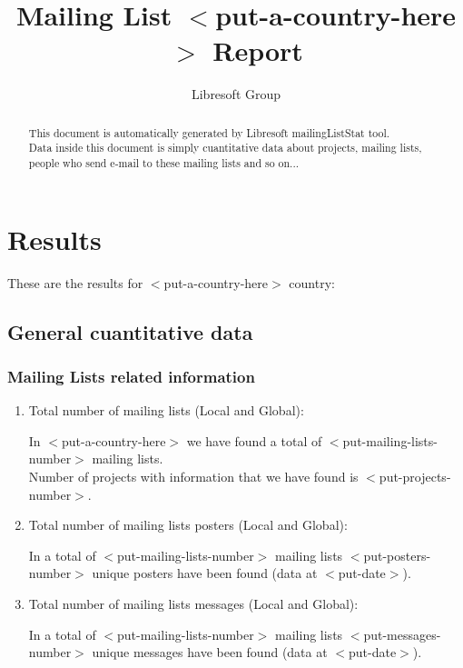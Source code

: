 \documentclass[a4paper,11pt]{report}
\title{Mailing List $<$put-a-country-here$>$ Report}
\author{Libresoft Group}
\begin{document}
\maketitle
\newpage

\begin{abstract}
This document is automatically generated by Libresoft mailingListStat tool.\\
Data inside this document is simply cuantitative data about projects, mailing
lists, people who send e-mail to these mailing lists and so on...
\end{abstract}
\newpage




\chapter*{Results}

    These are the results for $<$put-a-country-here$>$ country:

    \section {General cuantitative data}

        \subsection {Mailing Lists related information}

            \begin{enumerate}
                \item Total number of mailing lists (Local and Global):

                    In $<$put-a-country-here$>$ we have found a total of
                    $<$put-mailing-lists-number$>$ mailing lists.\\

                    Number of projects with information that we have found is $<$put-projects-number$>$.\\


                \item Total number of mailing lists posters (Local and Global):

                    In a total of $<$put-mailing-lists-number$>$ mailing lists
                    $<$put-posters-number$>$ unique posters have been found
                    (data at  $<$put-date$>$).


                \item Total number of mailing lists messages (Local and Global):

                    In a total of $<$put-mailing-lists-number$>$ mailing lists
                    $<$put-messages-number$>$ unique messages have been found
                    (data at  $<$put-date$>$).

            \end{enumerate}
\end{document}
